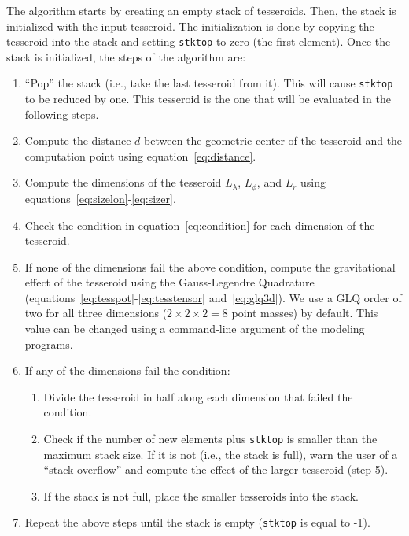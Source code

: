 \documentclass[paper,twocolumn]{geophysics}
\begin{document}
The algorithm starts by creating an empty stack of tesseroids.
Then, the stack is initialized with the input tesseroid.
The initialization is done by copying the tesseroid into the stack
and setting \texttt{stktop} to zero (the first element).
Once the stack is initialized, the steps of the algorithm are:

\begin{enumerate}
    \item ``Pop'' the stack (i.e., take the last tesseroid from it).
        This will cause \texttt{stktop} to be reduced by one.
        This tesseroid is the one that will be evaluated in the following
        steps.
    \item Compute the distance $d$ between
        the geometric center of the tesseroid and
        the computation point using equation~\ref{eq:distance}.
    \item Compute the dimensions of the tesseroid $L_\lambda$, $L_\phi$,
        and $L_r$ using equations~\ref{eq:sizelon}-\ref{eq:sizer}.
    \item Check the condition in equation~\ref{eq:condition} for each
        dimension of the tesseroid.
    \item If none of the dimensions fail the above condition,
        compute the gravitational effect of the tesseroid using the
        Gauss-Legendre Quadrature
        (equations~\ref{eq:tesspot}-\ref{eq:tesstensor} and~\ref{eq:glq3d}).
        We use a GLQ order of two for all three dimensions
        ($2 \times 2 \times 2 = 8$ point masses)
        by default.
        This value can be changed using
        a command-line argument of the modeling programs.
    \item If any of the dimensions fail the condition:
    \begin{enumerate}
        \item Divide the tesseroid in half along each dimension that failed
             the condition.
        \item Check if the number of new elements plus \texttt{stktop}
             is smaller than the maximum stack size.
             If it is not (i.e., the stack is full),
             warn the user of a ``stack overflow''
             and compute the effect of the larger tesseroid (step 5).
        \item If the stack is not full, place the smaller tesseroids into
             the stack.
    \end{enumerate}
    \item Repeat the above steps until the stack is empty
        (\texttt{stktop} is equal to -1).
\end{enumerate}
\end{document}
